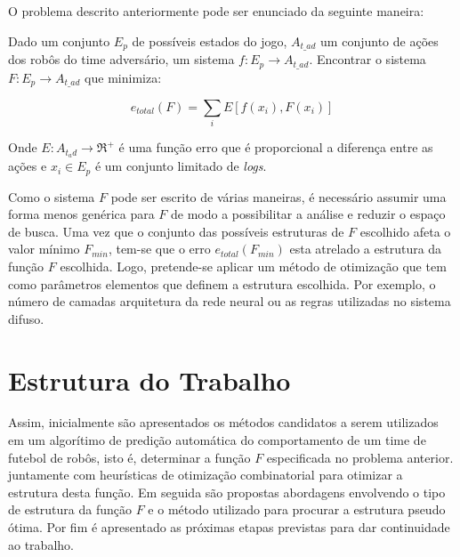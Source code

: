 O problema descrito anteriormente pode ser enunciado da seguinte maneira:

Dado um conjunto $E_p$ de possíveis estados do jogo, $A_{t\_ad}$ um conjunto de ações dos robôs
do time adversário, um sistema $f: {E_p} \rightarrow {A_{t\_ad}}$. Encontrar o sistema 
$F: {E_p} \rightarrow {A_{t\_ad}}$ que minimiza:

\begin{equation}
e_{total}(F) = \sum_i E[f(x_i),F(x_i)]
\end{equation}

Onde $E: A_{t_ad} \rightarrow \Re^+$ é uma função erro que é proporcional a diferença entre as ações e
${x_i} \in E_p$ é um conjunto limitado de \textit{logs}.

Como o sistema $F$ pode ser escrito de várias maneiras, é necessário assumir uma forma menos genérica
para $F$ de modo a possibilitar a análise e reduzir o espaço de busca. Uma vez que o conjunto das possíveis estruturas de $F$
escolhido afeta o valor mínimo $F_{min}$, tem-se que o erro $e_{total}(F_{min})$ esta atrelado a estrutura da função
$F$ escolhida. Logo, pretende-se aplicar um método de otimização que tem como parâmetros elementos que definem a estrutura
escolhida. Por exemplo, o número de camadas arquitetura da rede neural ou as regras utilizadas no sistema difuso.

\section{Estrutura do Trabalho}


\par Assim, inicialmente são apresentados os métodos candidatos a serem utilizados em um algorítimo de predição
automática do comportamento de um time de futebol de robôs, isto é, determinar a função $F$ especificada no problema anterior.
juntamente com heurísticas de otimização combinatorial para otimizar a estrutura desta função. Em seguida são propostas
abordagens envolvendo o tipo de estrutura da função $F$ e o método utilizado para procurar a estrutura pseudo ótima. Por fim é
apresentado as próximas etapas previstas para dar continuidade ao trabalho.
